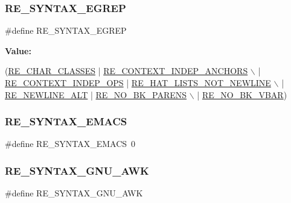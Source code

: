\subsubsection{\texorpdfstring{R\+E\+\_\+\+S\+Y\+N\+T\+A\+X\+\_\+\+E\+G\+R\+EP}{RE\_SYNTAX\_EGREP}}
{\footnotesize\ttfamily \#define R\+E\+\_\+\+S\+Y\+N\+T\+A\+X\+\_\+\+E\+G\+R\+EP}

{\bfseries Value\+:}
\begin{DoxyCode}
(\hyperlink{a00092_a9650e76532d0ae7c8cc3ea5eb6dee6e7}{RE\_CHAR\_CLASSES}        | \hyperlink{a00092_a544bf7770a00eaaa62374a00fea08a2d}{RE\_CONTEXT\_INDEP\_ANCHORS}           \(\backslash\)
   | \hyperlink{a00092_aa96ee57fb2be85936dbb14f2b4c44b50}{RE\_CONTEXT\_INDEP\_OPS} | \hyperlink{a00092_aad6ec0e3f8f0bb3c53213e3f9ca77d8e}{RE\_HAT\_LISTS\_NOT\_NEWLINE}            
      \(\backslash\)
   | \hyperlink{a00092_a7a69bf315a61cb9d674332a6a5d64819}{RE\_NEWLINE\_ALT}       | \hyperlink{a00092_af2f17f18a9c771c91d963f466f559e68}{RE\_NO\_BK\_PARENS}                \(\backslash\)
   | \hyperlink{a00092_a834997e69569c41f0394d6ee120051a0}{RE\_NO\_BK\_VBAR})
\end{DoxyCode}
\mbox{\label{a00092_a7365928faf49388fd134be803a3d162c}} 
\subsubsection{\texorpdfstring{R\+E\+\_\+\+S\+Y\+N\+T\+A\+X\+\_\+\+E\+M\+A\+CS}{RE\_SYNTAX\_EMACS}}
{\footnotesize\ttfamily \#define R\+E\+\_\+\+S\+Y\+N\+T\+A\+X\+\_\+\+E\+M\+A\+CS~0}

\mbox{\label{a00092_a9eadf9d2d61caa491fe3ff09b895a029}} 
\subsubsection{\texorpdfstring{R\+E\+\_\+\+S\+Y\+N\+T\+A\+X\+\_\+\+G\+N\+U\+\_\+\+A\+WK}{RE\_SYNTAX\_GNU\_AWK}}
{\footnotesize\ttfamily \#define R\+E\+\_\+\+S\+Y\+N\+T\+A\+X\+\_\+\+G\+N\+U\+\_\+\+A\+WK}

